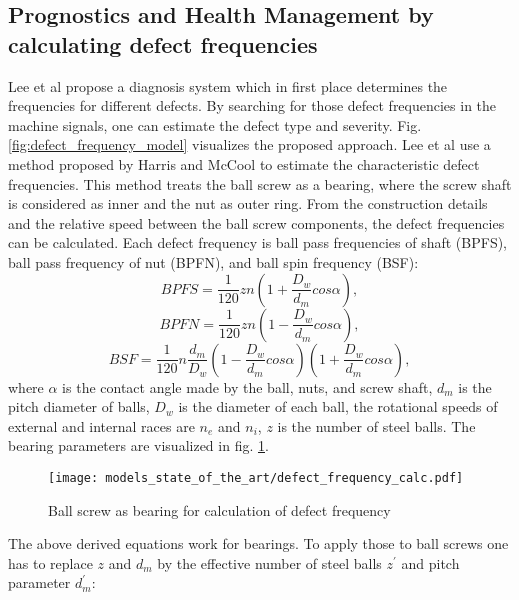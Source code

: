 \subsection{Prognostics and Health Management by calculating defect frequencies}
Lee et al \cite{Lee2015} propose a diagnosis system which in first place determines the frequencies for different defects. By searching for those defect frequencies in the machine signals, one can estimate the defect type and severity. Fig. \ref{fig:defect_frequency_model} visualizes the proposed approach. Lee et al use a method proposed by Harris and McCool \cite{Harris1996} to estimate the characteristic defect frequencies. This method treats the ball screw as a bearing, where the screw shaft is considered as inner and the nut as outer ring. From the construction details and the relative speed between the ball screw components, the defect frequencies can be calculated. Each defect frequency is ball pass frequencies of shaft (BPFS), ball pass frequency of nut (BPFN), and ball spin frequency (BSF): 
\begin{equation}
    BPFS = \frac{1}{120}zn(1+\frac{D_{w}}{d_{m}}cos\alpha),
    \label{eq:defect_frequency}
\end{equation}
\begin{equation}
    BPFN = \frac{1}{120}zn(1-\frac{D_{w}}{d_{m}}cos\alpha),
\end{equation}
\begin{equation}
    BSF = \frac{1}{120}n\frac{d_{m}}{D_{w}} (1-\frac{D_{w}}{d_{m}}cos\alpha)(1+\frac{D_{w}}{d_{m}}cos\alpha) ,
\end{equation}
where $\alpha$ is the contact angle made by the ball, nuts, and screw shaft, $d_{m}$ is the pitch diameter of balls, $D_{w}$ is the diameter of each ball, the rotational speeds of external and internal races are $n_{e}$ and $n_{i}$, $z$ is the number of steel balls. The bearing parameters are visualized in fig. \ref{fig:defect_frequency_calc}. 

\begin{figure}[H]
  \centering
  \texttt{[image: models\_state\_of\_the\_art/defect\_frequency\_calc.pdf]}
  \caption{Ball screw as bearing for calculation of defect frequency \cite{Lee2015}}
  \label{fig:defect_frequency_calc}
\end{figure}

The above derived equations work for bearings. To apply those to ball screws one has to replace $z$ and $d_{m}$ by the effective number of steel balls $z^{'}$ and pitch parameter $d_{m}^{'}$:

